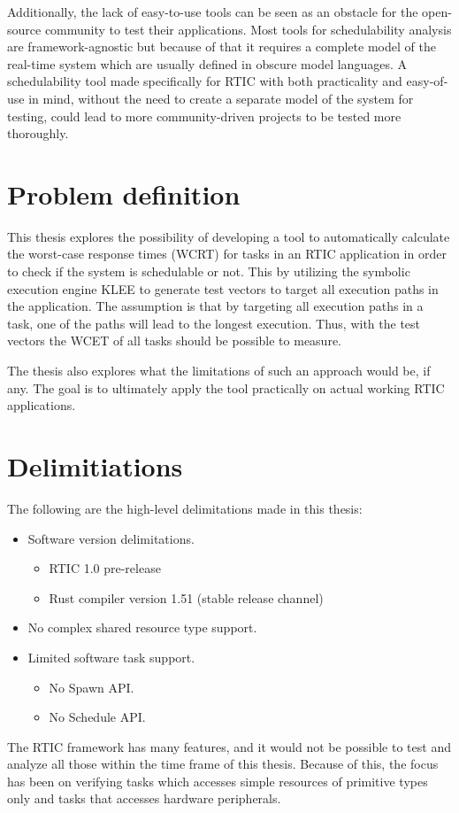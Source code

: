 Additionally, the lack of easy-to-use tools can be seen as an obstacle for the
open-source community to test their applications. Most tools for schedulability
analysis are framework-agnostic but because of that it requires a complete
model of the real-time system which are usually defined in obscure model
languages. A schedulability tool made specifically for RTIC with both
practicality and easy-of-use in mind, without the need to create a separate
model of the system for testing, could lead to more community-driven projects
to be tested more thoroughly.

\section{Problem definition}
This thesis explores the possibility of developing a tool to automatically
calculate the worst-case response times (WCRT) for tasks in an RTIC application
in order to check if the system is schedulable or not. This by utilizing the
symbolic execution engine KLEE to generate test vectors to target all execution
paths in the application. The assumption is that by targeting all execution
paths in a task, one of the paths will lead to the longest execution. Thus,
with the test vectors the WCET of all tasks should be possible to measure.

The thesis also explores what the limitations of such an approach would be, if
any. The goal is to ultimately apply the tool practically on actual working
RTIC applications.

\section{Delimitiations}
The following are the high-level delimitations made in this thesis:
\begin{itemize}
    \item Software version delimitations.
    \begin{itemize}
        \item RTIC 1.0 pre-release
        \item Rust compiler version 1.51 (stable release channel)
    \end{itemize}
    \item No complex shared resource type support.
    \item Limited software task support.
    \begin{itemize}
        \item No Spawn API\@.
        \item No Schedule API\@.
    \end{itemize}
\end{itemize}
The RTIC framework has many features, and it would not be possible to test and
analyze all those within the time frame of this thesis. Because of this, the
focus has been on verifying tasks which accesses simple resources of primitive
types only and tasks that accesses hardware peripherals.

